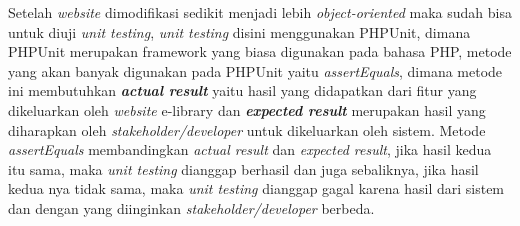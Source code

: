 \documentclass[a4paper,twoside]{article}
\begin{document}
\begin{enumerate}
		Setelah \textit{website} dimodifikasi sedikit menjadi lebih  \textit{object-oriented} maka sudah bisa untuk diuji \textit{unit testing}, \textit{unit testing} disini menggunakan PHPUnit, dimana PHPUnit merupakan framework yang biasa digunakan pada bahasa PHP, metode yang akan banyak digunakan pada PHPUnit yaitu \textit{assertEquals}, dimana metode ini membutuhkan \textit{\textbf{actual result}} yaitu hasil yang didapatkan dari fitur yang dikeluarkan oleh \textit{website} e-library dan \textit{\textbf{expected result}} merupakan hasil yang diharapkan oleh \textit{stakeholder/developer} untuk dikeluarkan oleh sistem. Metode \textit{assertEquals} membandingkan \textit{actual result} dan \textit{expected result}, jika hasil kedua itu sama, maka \textit{unit testing} dianggap berhasil dan juga sebaliknya, jika hasil kedua nya tidak sama, maka \textit{unit testing} dianggap gagal karena hasil dari sistem dan dengan yang diinginkan \textit{stakeholder/developer} berbeda.
        

\end{enumerate}
\end{document}
